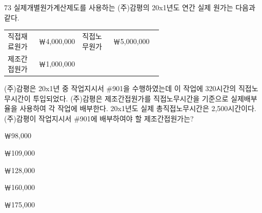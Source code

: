 \begin{question}{73}
실제개별원가계산제도를 사용하는 (주)감평의 20x1년도 연간 실제 원가는 다음과 같다.
\begin{framedtext}
\begin{tabular}{@{}p{0.2\linewidth}p{0.2\linewidth}p{0.2\linewidth}l@{}}
직접재료원가 & ￦4,000,000 & 직접노무원가 & ￦5,000,000 \\
제조간접원가 & ￦1,000,000 & & \\
\end{tabular}
\end{framedtext}
(주)감평은 20x1년 중 작업지시서 \#901을 수행하였는데 이 작업에 320시간의 직접노무시간이 투입되었다. (주)감평은 제조간접원가를 직접노무시간을 기준으로 실제배부율을 사용하여 각 작업에 배부한다. 20x1년도 실제 총직접노무시간은 2,500시간이다. (주)감평이 작업지시서 \#901에 배부하여야 할 제조간접원가는? \par
\begin{choices}
  \item ￦98,000
  \item ￦109,000
  \item ￦128,000
  \item ￦160,000
  \item ￦175,000
\end{choices}
\end{question}
